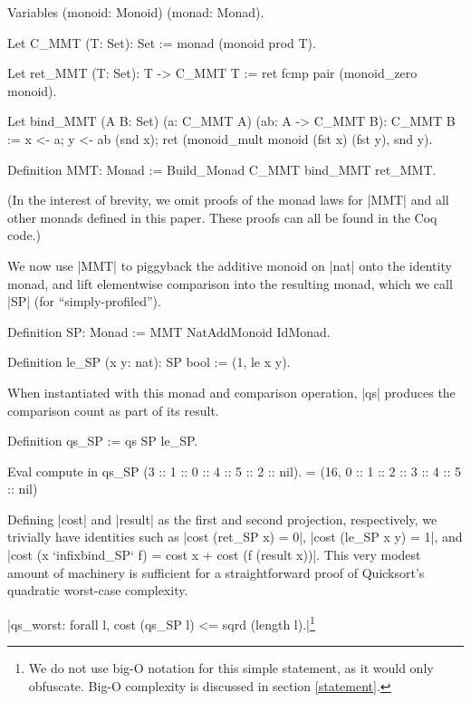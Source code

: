 \documentclass[runningheads]{llncs}
\begin{document}
\begin{code}
  Variables (monoid: Monoid) (monad: Monad).

  Let C_MMT (T: Set): Set := monad (monoid prod T).

  Let ret_MMT (T: Set): T -> C_MMT T := ret fcmp pair (monoid_zero monoid).

  Let bind_MMT (A B: Set) (a: C_MMT A) (ab: A -> C_MMT B): C_MMT B :=
    x <- a; y <- ab (snd x); ret (monoid_mult monoid (fst x) (fst y), snd y).

  Definition MMT: Monad := Build_Monad C_MMT bind_MMT ret_MMT.
\end{code}
(In the interest of brevity, we omit proofs of the monad laws for |MMT| and all other monads defined in this paper. These proofs can all be found in the Coq code.)

We now use |MMT| to piggyback the additive monoid on |nat| onto the identity monad, and lift elementwise comparison into the resulting monad, which we call |SP| (for ``simply-profiled'').
\begin{code}
  Definition SP: Monad := MMT NatAddMonoid IdMonad.

  Definition le_SP (x y: nat): SP bool := (1, le x y).
\end{code}
When instantiated with this monad and comparison operation, |qs| produces the comparison count as part of its result.
\begin{code}
  Definition qs_SP := qs SP le_SP.

  Eval compute in qs_SP (3 :: 1 :: 0 :: 4 :: 5 :: 2 :: nil).
    = (16, 0 :: 1 :: 2 :: 3 :: 4 :: 5 :: nil)
\end{code}
Defining |cost| and |result| as the first and second projection, respectively, we trivially have identities such as |cost (ret_SP x) = 0|, |cost (le_SP x y) = 1|, and |cost (x `infixbind_SP` f) = cost x + cost (f (result x))|. This very modest amount of machinery is sufficient for a straightforward proof of Quicksort's quadratic worst-case complexity.

\begin{propo}|qs_worst: forall l, cost (qs_SP l) <= sqrd (length l).|\footnote{We do not use big-O notation for this simple statement, as it would only obfuscate. Big-O complexity is discussed in section \ref{statement}.}
\end{propo}
\end{document}
